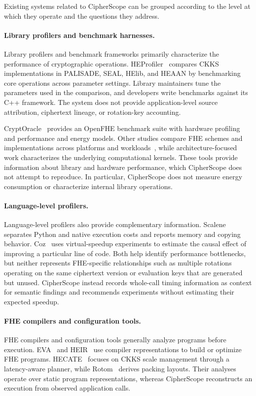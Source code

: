 \documentclass[sigconf,nonacm]{acmart}
\begin{document}
Existing systems related to CipherScope can be grouped according to the level
at which they operate and the questions they address.

\paragraph{Library profilers and benchmark harnesses.} Library profilers and
benchmark frameworks primarily characterize the performance of cryptographic
operations. HEProfiler~\cite{takeshita2025heprofiler} compares CKKS
implementations in PALISADE, SEAL, HElib, and HEAAN by benchmarking core
operations across parameter settings. Library maintainers tune the parameters
used in the comparison, and developers write benchmarks against its C++
framework. The system does not provide application-level source attribution,
ciphertext lineage, or rotation-key accounting.

CryptOracle~\cite{cryptoracle2025} provides an OpenFHE benchmark suite with
hardware profiling and performance and energy models. Other studies compare
FHE schemes and implementations across platforms and
workloads~\cite{crossplatform2025,safetycentric2025}, while architecture-focused
work characterizes the underlying computational kernels. These tools provide
information about library and hardware performance, which CipherScope does
not attempt to reproduce. In particular, CipherScope does not measure energy
consumption or characterize internal library operations.

\paragraph{Language-level profilers.} Language-level profilers also provide
complementary information. Scalene~\cite{berger2023scalene} separates Python
and native execution costs and reports memory and copying behavior.
Coz~\cite{curtsinger2015coz} uses virtual-speedup experiments to estimate the
causal effect of improving a particular line of code. Both help identify
performance bottlenecks, but neither represents FHE-specific relationships
such as multiple rotations operating on the same ciphertext version or
evaluation keys that are generated but unused. CipherScope instead records
whole-call timing information as context for semantic findings and recommends
experiments without estimating their expected speedup.

\paragraph{FHE compilers and configuration tools.} FHE compilers and
configuration tools generally analyze programs before execution.
EVA~\cite{dathathri2020eva} and HEIR~\cite{heir2025} use compiler
representations to build or optimize FHE programs. HECATE~\cite{hecate2022}
focuses on CKKS scale management through a latency-aware planner, while
Rotom~\cite{rotom2026} derives packing layouts. Their analyses operate over
static program representations, whereas CipherScope reconstructs an execution
from observed application calls.
\end{document}
